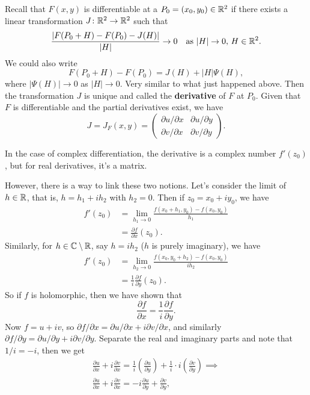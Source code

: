 Recall that $F(x,y)$ is differentiable at a $P_0=(x_0,y_0)\in \mathbb{R}^2$ if there exists a linear transformation $J \colon \mathbb{R}^2 \to \mathbb{R}^2$ such that \[
    \frac{\left| F(P_0+H)-F(P_0)-J(H) \right| }{|H|}\to 0 \quad \text{as} \ |H|\to 0,\, H\in \mathbb{R}^2.
\] We could also write \[
F(P_0+H)-F(P_0)=J(H)+|H|\Psi(H),
\] where $|\Psi(H)|\to 0$ as $|H|\to 0$. Very similar to what just happened above. Then the transformation $J$ is unique and called the \textbf{derivative} of $F$ at $P_0$. Given that $F$ is differentiable and the partial derivatives exist, we have \[
J=J_F(x,y)=
\begin{pmatrix}
    \partial u/\partial x & \partial u/\partial y\\
    \partial v/\partial x & \partial v/\partial y
\end{pmatrix}.
\] 
\begin{note}
    In the case of complex differentiation, the derivative is a complex number $f'(z_0)$, but for real derivatives, it's a matrix.
\end{note}
However, there is a way to link these two notions. Let's consider the limit of $h\in \mathbb{R}$, that is, $h=h_1+ih_2$ with $h_2=0$. Then if $z_0=x_0+iy_0$, we have 
\begin{align*}
    f'(z_0)&= \lim_{h_1 \to 0} \frac{f(x_0+h_1,y_0)-f(x_0,y_0)}{h_1}\\
           &= \frac{\partial f}{\partial x}(z_0).
\end{align*} Similarly, for $h\in \mathbb{C}\setminus \mathbb{R}$, say $h=ih_2$ ($h$ is purely imaginary), we have 
\begin{align*}
    f'(z_0)&= \lim_{h_2 \to 0} \frac{f(x_0,y_0+h_2)-f(x_0,y_0)}{ih_2}\\
           &=\frac{1}{i} \frac{\partial f}{\partial y}(z_0).
\end{align*} So if $f$ is holomorphic, then we have shown that \[
\frac{\partial f}{\partial x}=\frac{1}{i} \frac{\partial f}{\partial y}.
\] Now $f=u+iv$, so $\partial f / \partial x=\partial u / \partial x + i\partial v/ \partial x$, and similarly $\partial f / \partial y=\partial u /\partial y+i\partial v /\partial y$. Separate the real and imaginary parts and note that $1 / i=-i$, then we get 
\begin{gather*}
    \frac{\partial u}{\partial x}+i \frac{\partial v}{\partial x}= \frac{1}{i}\left( \frac{\partial u}{\partial y} \right) +\frac{1}{i}\cdot i \left( \frac{\partial v}{\partial y}\right)  \implies \\
\frac{\partial u}{\partial x}+i \frac{\partial v}{\partial x}= -i \frac{\partial u}{\partial y} + \frac{\partial v}{\partial y}, 
\end{gather*}
